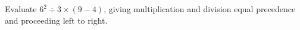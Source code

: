 Evaluate $6^2\div3\times(9-4)$, giving multiplication and division equal precedence and proceeding left to right.
